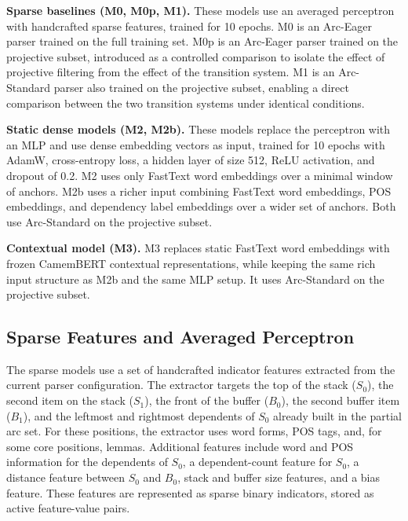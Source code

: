 \documentclass[12pt,letterpaper]{article}
\begin{document}
\textbf{Sparse baselines (M0, M0p, M1).} These models use an averaged perceptron with handcrafted sparse features, trained for 10 epochs. M0 is an Arc-Eager parser trained on the full training set. M0p is an Arc-Eager parser trained on the projective subset, introduced as a controlled comparison to isolate the effect of projective filtering from the effect of the transition system. M1 is an Arc-Standard parser also trained on the projective subset, enabling a direct comparison between the two transition systems under identical conditions.

\textbf{Static dense models (M2, M2b).} These models replace the perceptron with an MLP and use dense embedding vectors as input, trained for 10 epochs with AdamW, cross-entropy loss, a hidden layer of size 512, ReLU activation, and dropout of 0.2. M2 uses only FastText word embeddings over a minimal window of anchors. M2b uses a richer input combining FastText word embeddings, POS embeddings, and dependency label embeddings over a wider set of anchors. Both use Arc-Standard on the projective subset.

\textbf{Contextual model (M3).} M3 replaces static FastText word embeddings with frozen CamemBERT contextual representations, while keeping the same rich input structure as M2b and the same MLP setup. It uses Arc-Standard on the projective subset.
\subsection{Sparse Features and Averaged Perceptron}
\label{subsec:sparse_models}

The sparse models use a set of handcrafted indicator features extracted from 
the current parser configuration. The extractor targets the top of the stack 
($S_0$), the second item on the stack ($S_1$), the front of the buffer 
($B_0$), the second buffer item ($B_1$), and the leftmost and rightmost 
dependents of $S_0$ already built in the partial arc set. For these 
positions, the extractor uses word forms, POS tags, and, for some core 
positions, lemmas. Additional features include word and POS information for 
the dependents of $S_0$, a dependent-count feature for $S_0$, a distance 
feature between $S_0$ and $B_0$, stack and buffer size features, and a bias 
feature. These features are represented as sparse binary indicators, stored 
as active feature-value pairs.
\end{document}
